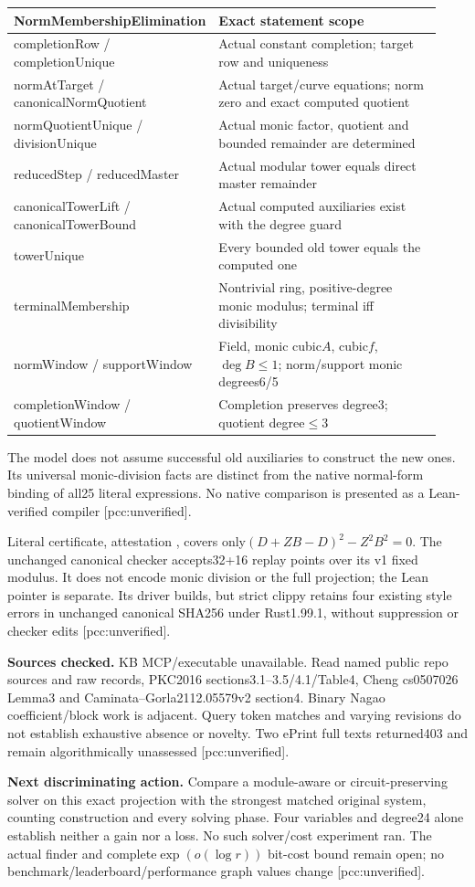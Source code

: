 \documentclass[11pt]{article}
\begin{document}
\begin{center}\footnotesize
\begin{tabular}{p{0.38\linewidth}p{0.55\linewidth}}
NormMembershipElimination & Exact statement scope\\\hline
completionRow / completionUnique & Actual constant completion; target row and uniqueness\\
normAtTarget / canonicalNormQuotient & Actual target/curve equations; norm zero and exact computed quotient\\
normQuotientUnique / divisionUnique & Actual monic factor, quotient and bounded remainder are determined\\
reducedStep / reducedMaster & Actual modular tower equals direct master remainder\\
canonicalTowerLift / canonicalTowerBound & Actual computed auxiliaries exist with the degree guard\\
towerUnique & Every bounded old tower equals the computed one\\
terminalMembership & Nontrivial ring, positive-degree monic modulus; terminal iff divisibility\\
normWindow / supportWindow & Field, monic cubic$A$, cubic$f$, $\deg B\le1$; norm/support monic degrees6/5\\
completionWindow / quotientWindow & Completion preserves degree3; quotient degree$\le3$
\end{tabular}
\end{center}
The model does not assume successful old auxiliaries to construct the new
ones. Its universal monic-division facts are distinct from the native
normal-form binding of all25 literal expressions. No native comparison is
presented as a Lean-verified compiler [pcc:unverified].

Literal certificate, attestation
, covers only$(D+ZB-D)^2-Z^2B^2=0$.
The unchanged canonical checker accepts32+16 replay points over its v1
fixed modulus. It does not encode monic division or the full projection;
the Lean pointer is separate. Its driver builds, but strict clippy retains
four existing style errors in unchanged canonical SHA256 under Rust1.99.1,
without suppression or checker edits [pcc:unverified].

\textbf{Sources checked.} KB MCP/executable unavailable. Read named public
repo sources and raw records, PKC2016 sections3.1--3.5/4.1/Table4,
Cheng cs0507026 Lemma3 and Caminata--Gorla2112.05579v2 section4.
Binary Nagao coefficient/block work is adjacent. Query token matches and
varying revisions do not establish exhaustive absence or novelty. Two
ePrint full texts returned403 and remain algorithmically unassessed
[pcc:unverified].

\textbf{Next discriminating action.} Compare a module-aware or circuit-preserving
solver on this exact projection with the strongest matched original system,
counting construction and every solving phase. Four variables and degree24
alone establish neither a gain nor a loss. No such solver/cost experiment
ran. The actual finder and complete$\exp(o(\log r))$ bit-cost bound remain
open; no benchmark/leaderboard/performance graph values change
[pcc:unverified].
\end{document}
